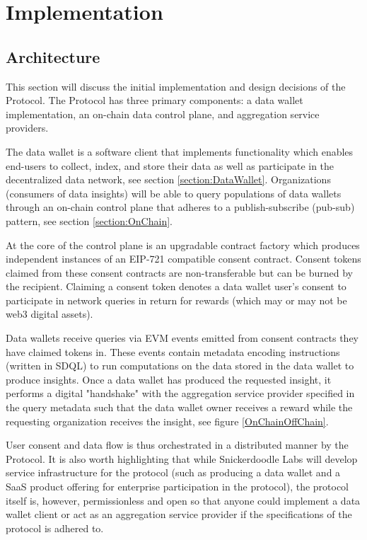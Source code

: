 \section{Implementation}
\label{section:Implementation}
\subsection{Architecture}
\label{section:Architecture}

This section will discuss the initial implementation and design decisions of the Protocol. The Protocol has three primary 
components: a data wallet implementation, an on-chain data control plane, and aggregation service providers.

The data wallet is a software client that implements functionality which enables end-users to collect, index, and store their data as well as participate 
in the decentralized data network, see section \ref{section:DataWallet}. Organizations (consumers of data insights) will be able 
to query populations of data wallets through an on-chain control plane that adheres to a publish-subscribe (pub-sub) pattern, see section \ref{section:OnChain}. 

At the core of the control plane is an upgradable contract factory which produces independent instances of an EIP-721 compatible consent contract. 
Consent tokens claimed from these consent contracts are non-transferable but can be burned by the recipient. Claiming a consent token denotes a data 
wallet user's consent to participate in network queries in return for rewards (which may or may not be web3 digital assets). 

Data wallets receive queries via EVM events emitted from consent contracts they have claimed tokens in. These events contain metadata encoding
instructions (written in SDQL) to run computations on the data stored in the data wallet to produce insights. Once a data wallet has produced
the requested insight, it performs a digital "handshake" with the aggregation service provider specified in the query metadata such that the 
data wallet owner receives a reward while the requesting organization receives the insight, see figure \ref{OnChainOffChain}. 

User consent and data flow is thus orchestrated in a distributed manner by the Protocol. It is also worth highlighting that while 
Snickerdoodle Labs will develop service infrastructure for the protocol (such as producing a data wallet and a SaaS product offering 
for enterprise participation in the protocol), the protocol itself is, however, permissionless and open so that anyone could implement a 
data wallet client or act as an aggregation service provider if the specifications of the protocol is adhered to. 
